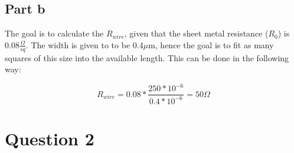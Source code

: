 \documentclass{article}
\begin{document}
\subsection*{Part b}
The goal is to calculate the $R_{wire}$, given that the sheet metal resistance ($R_{0}$) is 0.08$\frac{\Omega}{sq}$.
The width is given to to be 0.4$\mu$m, hence the goal is to fit as many squares of this size into the available length.
This can be done in the following way:

\begin{equation}
    R_{wire} = 0.08 * \frac{250 * 10^{-6}}{0.4 * 10^{-6}} = 50\Omega
\end{equation}

\section*{Question 2}
\end{document}
